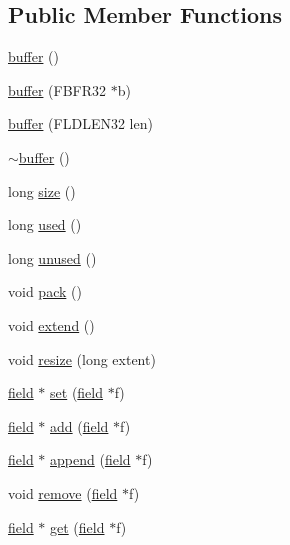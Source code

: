 \subsection*{Public Member Functions}
\begin{DoxyCompactItemize}
\item 
\hyperlink{classatmi_1_1buffer_ab5a434d367c856f9b1b7c831b98ff0d3}{buffer} ()
\item 
\hyperlink{classatmi_1_1buffer_a5a2836413da6d30d25afa2ea242cd90d}{buffer} (F\+B\+F\+R32 $\ast$b)
\item 
\hyperlink{classatmi_1_1buffer_ae2bc183e6b0909b8155dcfa17686a574}{buffer} (F\+L\+D\+L\+E\+N32 len)
\item 
\hyperlink{classatmi_1_1buffer_aa58097eacc94f1f5cc5e99b434ec7135}{$\sim$buffer} ()
\item 
long \hyperlink{classatmi_1_1buffer_a5ee67d265b7919363d71cf00af79e598}{size} ()
\item 
long \hyperlink{classatmi_1_1buffer_a2bac749e70e7ce6967be7abadfe85ffe}{used} ()
\item 
long \hyperlink{classatmi_1_1buffer_a7f6deadb4060641ad16aa242f787758e}{unused} ()
\item 
void \hyperlink{classatmi_1_1buffer_ab9294b1a1e54e35717db40cb6bbb6de1}{pack} ()
\item 
void \hyperlink{classatmi_1_1buffer_a853e2a0585dda4e23ffa04297b824afb}{extend} ()
\item 
void \hyperlink{classatmi_1_1buffer_a669b48d7cbabc7bc45608ab9343c0c51}{resize} (long extent)
\item 
\hyperlink{classatmi_1_1field}{field} $\ast$ \hyperlink{classatmi_1_1buffer_a97374f4ebf72c61e761cf875059c592b}{set} (\hyperlink{classatmi_1_1field}{field} $\ast$f)
\item 
\hyperlink{classatmi_1_1field}{field} $\ast$ \hyperlink{classatmi_1_1buffer_a0a9ec0818505c5898f2f9fc019155d0e}{add} (\hyperlink{classatmi_1_1field}{field} $\ast$f)
\item 
\hyperlink{classatmi_1_1field}{field} $\ast$ \hyperlink{classatmi_1_1buffer_a1122406dbbcb04c7ddd5bafbcb6c6f5c}{append} (\hyperlink{classatmi_1_1field}{field} $\ast$f)
\item 
void \hyperlink{classatmi_1_1buffer_a387dd9a90170e72720064169c161f1fe}{remove} (\hyperlink{classatmi_1_1field}{field} $\ast$f)
\item 
\hyperlink{classatmi_1_1field}{field} $\ast$ \hyperlink{classatmi_1_1buffer_a5922bd744eae562797426ff08f6f8d53}{get} (\hyperlink{classatmi_1_1field}{field} $\ast$f)

\end{DoxyCompactItemize}

